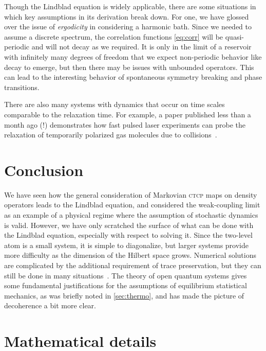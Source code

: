 \documentclass[../thesis.tex]{subfiles}
\begin{document}
Though the Lindblad equation is widely applicable, there are some situations in
which key assumptions in its derivation break down. For one, we have glossed
over the issue of \emph{ergodicity} in considering a harmonic bath. Since we
needed to assume a discrete spectrum, the correlation functions \cref{eq:corr}
will be quasi-periodic and will not decay as we required. It is only in the
limit of a reservoir with infinitely many degrees of freedom that we expect
non-periodic behavior like decay to emerge, but then there may be issues with
unbounded operators. This can lead to the interesting behavior of spontaneous
symmetry breaking and phase transitions.

There are also many systems with dynamics that occur on time scales comparable
to the relaxation time. For example, a paper published less than a month ago (!)
demonstrates how fast pulsed laser experiments can probe the relaxation of
temporarily polarized gas molecules due to
collisions~\cite{collisions1,collisions2}.

\section{Conclusion}

We have seen how the general consideration of Markovian \textsc{ctcp} maps on
density operators leads to the Lindblad equation, and considered the
weak-coupling limit as an example of a physical regime where the assumption of
stochastic dynamics is valid. However, we have only scratched the surface of
what can be done with the Lindblad equation, especially with respect to solving
it. Since the two-level atom is a small system, it is simple to diagonalize, but
larger systems provide more difficulty as the dimension of the Hilbert space
grows. Numerical solutions are complicated by the additional requirement of
trace preservation, but they can still be done in many
situations~\cite{intro,collisions1}. The theory of open quantum systems gives
some fundamental justifications for the assumptions of equilibrium statistical
mechanics, as was briefly noted in \cref{sec:thermo}, and has made the
picture of decoherence a bit more clear.

\section{Mathematical details\label{sec:math}}
\end{document}
